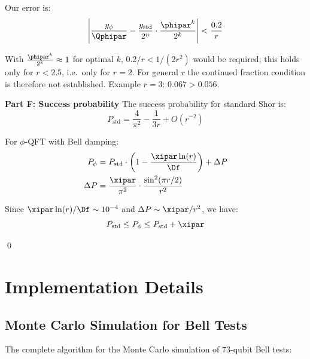 Our error is:
\[
\left| \frac{y_{\phi}}{\Qphipar} - \frac{y_{\text{std}}}{2^n} \cdot \frac{\phipar^k}{2^k} \right| < \frac{0.2}{r}
\]

With $\frac{\phipar^k}{2^k} \approx 1$ for optimal $k$, $0.2/r < 1/(2r^2)$ would be required; this holds only for $r < 2.5$, i.e.\ only for $r = 2$. For general $r$ the continued fraction condition is therefore not established. Example $r = 3$: $0.067 > 0.056$.

\textbf{Part F: Success probability}
The success probability for standard Shor is:
\[
P_{\text{std}} = \frac{4}{\pi^2} - \frac{1}{3r} + O(r^{-2})
\]

For $\phi$-QFT with Bell damping:
\begin{align*}
	P_{\phi} &= P_{\text{std}} \cdot \left(1 - \frac{\xipar \ln(r)}{\Df}\right) + \Delta P \\
	\Delta P &= \frac{\xipar}{\pi^2} \cdot \frac{\sin^2(\pi r/2)}{r^2}
\end{align*}

Since $\xipar \ln(r)/\Df \sim 10^{-4}$ and $\Delta P \sim \xipar/r^2$, we have:
\[
P_{\text{std}} \leq P_{\phi} \leq P_{\text{std}} + \xipar
\]

\qed

\section{Implementation Details}
\label{app:implementation}

\subsection{Monte Carlo Simulation for Bell Tests}
\label{app:monte_carlo}

The complete algorithm for the Monte Carlo simulation of 73-qubit Bell tests:

